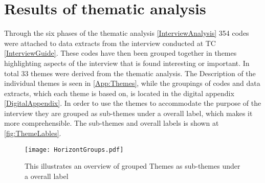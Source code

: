 \chapter{Results of thematic analysis}
\label{ThemanticAnalysis}


\noindent
Through the six phases of the thematic analysis \autoref{InterviewAnalysis} 354 codes were attached to data extracts from the interview conducted at TC \autoref{InterviewGuide}. These codes have then been grouped together in themes highlighting aspects of the interview that is found interesting or important. In total 33 themes were derived from the thematic analysis. The Description of the individual themes is seen in \autoref{App:Themes}, while the groupings of codes and data extracts, which each theme is based on, is located in the digital appendix \autoref{DigitalAppendix}. In order to use the themes to accommodate the purpose of the interview they are grouped as sub-themes under a overall label, which makes it more comprehensible. The sub-themes and overall labels is shown at \autoref{fig:ThemeLables}.

\begin{figure}[H]
	\centering
	\texttt{[image: HorizontGroups.pdf]}
	\caption{This illustrates an overview of grouped Themes as sub-themes under a overall label}
	\label{fig:ThemeLables}
\end{figure}

